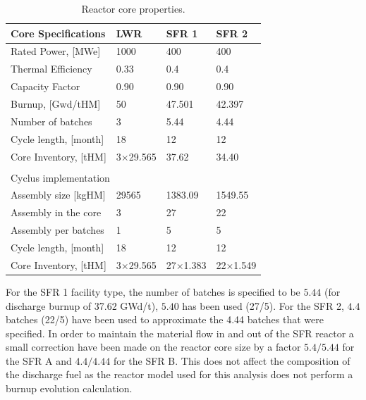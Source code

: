 \documentclass[12pt]{article}
\begin{document}
\begin{table}[h!]
    \centering
    \begin{tabularx}{350pt}{lXXX}
      \hline
      Core Specifications   &  LWR             &  SFR 1            &  SFR 2            \\
      \hline
      Rated Power, [MWe]    &  1000            &  400              &  400              \\
      Thermal Efficiency    &  0.33            &  0.4              &  0.4              \\
      Capacity Factor       &  0.90            &  0.90             &  0.90             \\
      Burnup, [Gwd/tHM]     &  50              &  47.501           &  42.397           \\
      Number of batches     &  3               &  5.44             &  4.44             \\
      Cycle length, [month] &  18              &  12               &  12               \\
      Core Inventory, [tHM] &  3$\times$29.565 &  37.62            &  34.40            \\
                                                                                       \\
      \multicolumn{4}{l}{Cyclus implementation}                                        \\ 
      \hline
      \hline
      Assembly size [kgHM]  &  29565           &  1383.09          & 1549.55           \\
      Assembly in the core  &  3               &  27               &  22               \\
      Assembly per batches  &  1               &  5                &  5                \\
      Cycle length, [month] &  18              &  12               &  12               \\
      Core Inventory, [tHM] &  3$\times$29.565 &  27$\times$1.383  &  22$\times$1.549  \\
      \hline
    \end{tabularx}
    \caption{Reactor core properties.}
    \label{tab:reactor}
\end{table}


For the SFR 1 facility type, the number of batches is specified to be $5.44$
(for discharge burnup of 37.62 GWd/t), $5.40$ has been used (27/5). For the SFR
2, $4.4$ batches (22/5) have been used to approximate the 4.44 batches that were
specified.  In order to maintain the material flow in and out of the SFR reactor
a small correction have been made on the reactor core size by a factor
$5.4/5.44$ for the SFR A and $4.4/4.44$ for the SFR B. This does not affect the
composition of the discharge fuel as the reactor model used for this analysis
does not perform a burnup evolution calculation.
\end{document}
